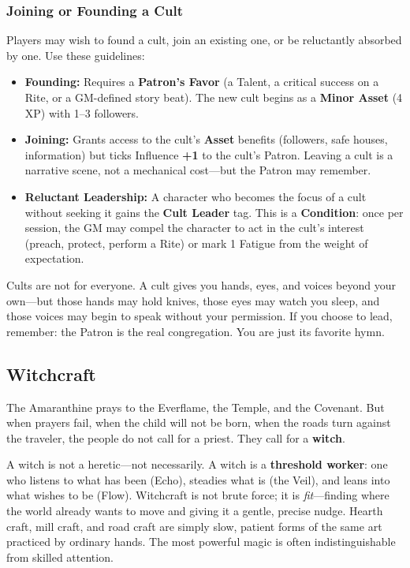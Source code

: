 \subsubsection*{Joining or Founding a Cult}

Players may wish to found a cult, join an existing one, or be reluctantly absorbed by one. Use these guidelines:

\begin{itemize}
  \item \textbf{Founding:} Requires a \textbf{Patron's Favor} (a Talent, a critical success on a Rite, or a GM-defined story beat). The new cult begins as a \textbf{Minor Asset} (4 XP) with 1--3 followers.
  \item \textbf{Joining:} Grants access to the cult's \textbf{Asset} benefits (followers, safe houses, information) but ticks Influence \textbf{+1} to the cult's Patron. Leaving a cult is a narrative scene, not a mechanical cost---but the Patron may remember.
  \item \textbf{Reluctant Leadership:} A character who becomes the focus of a cult without seeking it gains the \textbf{Cult Leader} tag. This is a \textbf{Condition}: once per session, the GM may compel the character to act in the cult's interest (preach, protect, perform a Rite) or mark 1 Fatigue from the weight of expectation.
\end{itemize}

\begin{tcolorbox}[colback=gray!5!white, colframe=black, title=Player Takeaway,breakable]
Cults are not for everyone. A cult gives you hands, eyes, and voices beyond your own---but those hands may hold knives, those eyes may watch you sleep, and those voices may begin to speak without your permission. If you choose to lead, remember: the Patron is the real congregation. You are just its favorite hymn.
\end{tcolorbox}

\subsection{Witchcraft}
\label{subsec:witchcraft}

The Amaranthine prays to the Everflame, the Temple, and the Covenant. But when prayers fail, when the child will not be born, when the roads turn against the traveler, the people do not call for a priest. They call for a \textbf{witch}.

A witch is not a heretic---not necessarily. A witch is a \textbf{threshold worker}: one who listens to what has been (Echo), steadies what is (the Veil), and leans into what wishes to be (Flow). Witchcraft is not brute force; it is \textit{fit}---finding where the world already wants to move and giving it a gentle, precise nudge. Hearth craft, mill craft, and road craft are simply slow, patient forms of the same art practiced by ordinary hands. The most powerful magic is often indistinguishable from skilled attention.

